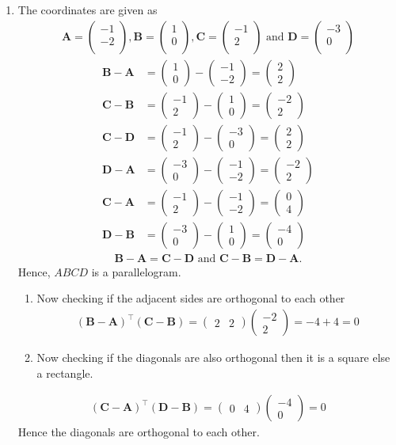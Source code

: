 \documentclass[12pt]{article}
\newcommand{\myvec}[1]{\ensuremath{\begin{pmatrix}#1\end{pmatrix}}}
\let\vec\mathbf
\begin{document}
\begin{enumerate}
\item The coordinates are given as
	\begin{align}
	\vec{A} = \myvec{
		-1\\
		-2\\
		},
	\vec{B} = \myvec{
		1\\
		0\\
		},
	\vec{C} = \myvec{
		-1\\
		2\\
		} \text{ and }
	\vec{D} = \myvec{
		-3\\
		0\\
		}
	\end{align}
	\begin{align}
		\vec{B} - \vec{A} &= \myvec{1\\0} - \myvec{-1\\-2} = \myvec{2\\2}\\
		\vec{C} - \vec{B} &= \myvec{-1\\2} - \myvec{1\\0} = \myvec{-2\\2}\\
		\vec{C} - \vec{D} &= \myvec{-1\\2} - \myvec{-3\\0} = \myvec{2\\2}\\
		\vec{D} - \vec{A} &= \myvec{-3\\0} - \myvec{-1\\-2} = \myvec{-2\\2}\\
		\vec{C} - \vec{A} &= \myvec{-1\\2} - \myvec{-1\\-2} = \myvec{0\\4}\\
		\vec{D} - \vec{B} &= \myvec{-3\\0} - \myvec{1\\0} = \myvec{-4\\0}
	\end{align}
	\begin{align}	
		\vec{B}-\vec{A} = \vec{C}-\vec{D} \text{ and } \vec{C}-\vec{B} = \vec{D}-\vec{A}.
	\end{align}
	Hence, $ABCD$ is a parallelogram.
	\begin{enumerate}
		\item Now checking if the adjacent sides are orthogonal to each other
	\begin{align}
		(\vec{B}-\vec{A})^\top (\vec{C}-\vec{B}) = \myvec{2&2} \myvec{-2\\2} = -4+4 = 0
	\end{align}
		\item Now checking if the diagonals are also orthogonal then it is a square else a rectangle.
	\end{enumerate}	
	\begin{align}
		(\vec{C}-\vec{A})^\top (\vec{D}-\vec{B}) = \myvec{0&4} \myvec{-4\\0} = 0
	\end{align}
	Hence the diagonals are orthogonal to each other.


\end{enumerate}
\end{document}
